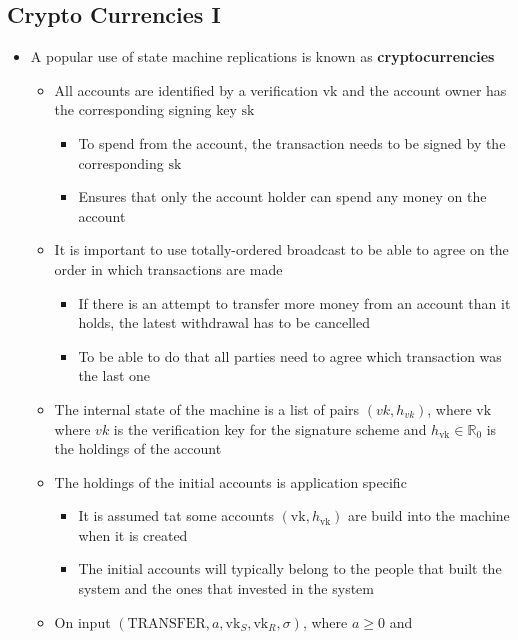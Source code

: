 \documentclass[11pt]{article}
\begin{document}
\subsection{Crypto Currencies I}
\label{sec:org33ec4c3}
\begin{itemize}
\item A popular use of state machine replications is known as \textbf{cryptocurrencies}
\begin{itemize}
\item All accounts are identified by a verification \(\text{vk}\) and the account owner has the corresponding signing key \(\text{sk}\)
\begin{itemize}
\item To spend from the account, the transaction needs to be signed by the corresponding \(\text{sk}\)
\item Ensures that only the account holder can spend any money on the account
\end{itemize}
\item It is important to use totally-ordered broadcast to be able to agree on the order in which transactions are made
\begin{itemize}
\item If there is an attempt to transfer more money from an account than it holds, the latest withdrawal has to be cancelled
\item To be able to do that all parties need to agree which transaction was the last one
\end{itemize}
\item The internal state of the machine is a list of pairs \((vk,h_{vk})\), where \(\text{vk}\) where \(vk\) is the verification key for the signature scheme and \(h_\text{vk} \in \mathbb R_0\) is the holdings of the account
\item The holdings of the initial accounts is application specific
\begin{itemize}
\item It is assumed tat some accounts \((\text{vk}, h_\text{vk})\) are build into the machine when it is created
\item The initial accounts will typically belong to the people that built the system and the ones that invested in the system
\end{itemize}
\item On input \((\text{TRANSFER}, a, \text{vk}_S, \text{vk}_R, \sigma)\), where \(a \geq 0\) and
\end{itemize}
\end{itemize}
\end{document}
